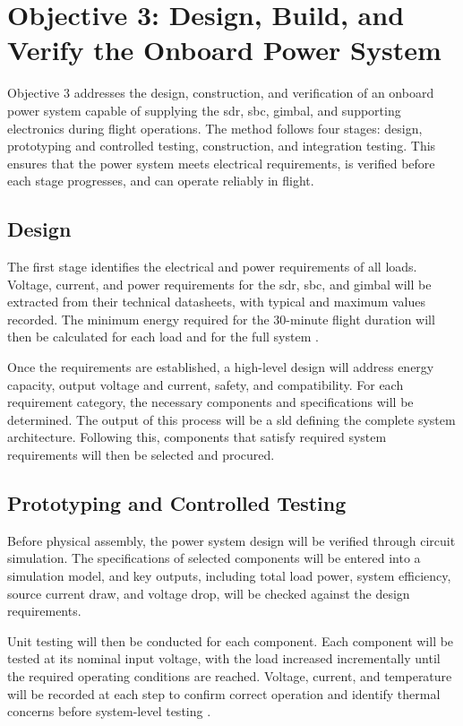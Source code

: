 \section{Objective 3: Design, Build, and Verify the Onboard Power System}

Objective 3 addresses the design, construction, and verification of an onboard power system capable of supplying the \gls{sdr}, \gls{sbc}, gimbal, and supporting electronics during flight operations. The method follows four stages: design, prototyping and controlled testing, construction, and integration testing. This ensures that the power system meets electrical requirements, is verified before each stage progresses, and can operate reliably in flight.

\subsection{Design}

The first stage identifies the electrical and power requirements of all loads. Voltage, current, and power requirements for the \gls{sdr}, \gls{sbc}, and gimbal will be extracted from their technical datasheets, with typical and maximum values recorded. The minimum energy required for the 30-minute flight duration will then be calculated for each load and for the full system \cite{aguascaARBRESLightWeightCW2013}.

Once the requirements are established, a high-level design will address energy capacity, output voltage and current, safety, and compatibility. For each requirement category, the necessary components and specifications will be determined. The output of this process will be a \gls{sld} defining the complete system architecture. Following this, components that satisfy required system requirements will then be selected and procured.

\subsection{Prototyping and Controlled Testing}

Before physical assembly, the power system design will be verified through circuit simulation. The specifications of selected components will be entered into a simulation model, and key outputs, including total load power, system efficiency, source current draw, and voltage drop, will be checked against the design requirements.

Unit testing will then be conducted for each component. Each component will be tested at its nominal input voltage, with the load increased incrementally until the required operating conditions are reached. Voltage, current, and temperature will be recorded at each step to confirm correct operation and identify thermal concerns before system-level testing \cite{ismailElectricPropulsionHybrid2025}.

